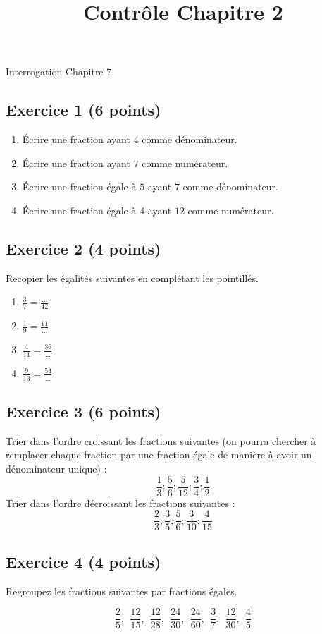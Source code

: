 \documentclass[14 pt]{extarticle}
\title{Contrôle Chapitre 2}
\date{}
\theoremstyle{plain}
\begin{document}
\begin{center}{\Large Interrogation Chapitre 7}\\ 
 \end{center}
 
 \subsection*{Exercice 1 (6 points)}
 

\begin{enumerate}
\item Écrire une fraction ayant $4$ comme dénominateur. 
\item Écrire une fraction ayant $7$ comme numérateur. 
\item Écrire une fraction égale à $5$ ayant $7$ comme dénominateur.
\item Écrire une fraction égale à $4$ ayant $12$ comme numérateur. 
\end{enumerate}
\subsection*{Exercice 2 (4 points)}
Recopier les égalités suivantes en complétant les pointillés. 
\begin{enumerate}
\item $\frac37=  \frac{\ldots}{42}$
\item $\frac1{9}= \frac{11}{\ldots}$
\item $\frac4{11}= \frac{36}{\ldots}$
\item $\frac{9}{13}= \frac{54}{\ldots}$
\end{enumerate}

\subsection*{Exercice 3 (6 points)}
Trier dans l'ordre croissant les fractions suivantes (on pourra chercher à remplacer chaque fraction par une fraction égale de manière à avoir un dénominateur unique) : 
\[ \frac13; \frac56 ; \frac5{12}; \frac34 ; \frac12 \]
Trier dans l'ordre décroissant les fractions suivantes : 
\[ \frac23 ; \frac 35 ; \frac56 ; \frac 3{10} ; \frac4{15} 
 \]
\subsection*{Exercice 4 (4 points)}
Regroupez les fractions suivantes par fractions égales. 

\[ \frac25, \ \  
 \frac{12}{15}, \ \    
 \frac{12}{28}, \ \  
 \frac{24}{30}, \ \  
  \frac{24}{60}, \ \  
   \frac37, \ \  
      \frac{12}{30}, \ \  
       \frac{4}{5}\]
 	
\end{document}
